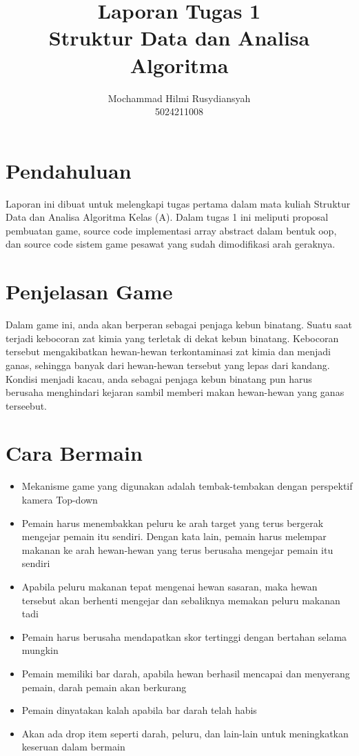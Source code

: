 \documentclass[11pt]{article} %
\title{Laporan Tugas 1\\Struktur Data dan Analisa Algoritma}
\author{Mochammad Hilmi Rusydiansyah\\5024211008}
\begin{document}
	\maketitle
	
	\section{Pendahuluan}
	Laporan ini dibuat untuk melengkapi tugas pertama dalam mata kuliah Struktur Data dan Analisa Algoritma Kelas (A). Dalam tugas 1 ini meliputi proposal pembuatan game, source code implementasi array abstract dalam bentuk oop, dan source code sistem game pesawat yang sudah dimodifikasi arah geraknya.
	
	\section{Penjelasan Game}
	Dalam game ini, anda akan berperan sebagai penjaga kebun binatang. Suatu saat terjadi kebocoran zat kimia yang terletak di dekat kebun binatang. Kebocoran tersebut mengakibatkan hewan-hewan terkontaminasi zat kimia dan menjadi ganas, sehingga banyak dari hewan-hewan tersebut yang lepas dari kandang. Kondisi menjadi kacau, anda sebagai penjaga kebun binatang pun harus berusaha menghindari kejaran sambil memberi makan hewan-hewan yang ganas terseebut.
	
	\section{Cara Bermain}
	\begin{itemize}
		\item Mekanisme game yang digunakan adalah tembak-tembakan dengan perspektif kamera Top-down
		
		\item Pemain harus menembakkan peluru ke arah target yang terus bergerak mengejar pemain itu sendiri. Dengan kata lain, pemain harus melempar makanan ke arah hewan-hewan yang terus berusaha mengejar pemain itu sendiri
		
		\item Apabila peluru makanan tepat mengenai hewan sasaran, maka hewan tersebut akan berhenti mengejar dan sebaliknya memakan peluru makanan tadi
		
		\item Pemain harus berusaha mendapatkan skor tertinggi dengan bertahan selama mungkin
		
		\item Pemain memiliki bar darah, apabila hewan berhasil mencapai dan menyerang pemain, darah pemain akan berkurang
		
		\item Pemain dinyatakan kalah apabila bar darah telah habis
		
		\item Akan ada drop item seperti darah, peluru, dan lain-lain untuk meningkatkan keseruan dalam bermain
	\end{itemize}
	
\end{document}
